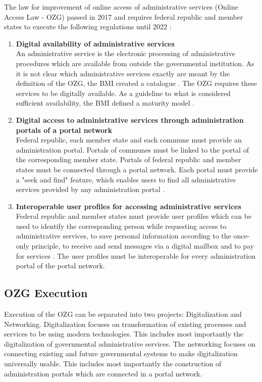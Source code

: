 \documentclass[
     12pt,         %
     a4paper,      %
     BCOR=10mm,version=first,     %
     DIV=14,version=first,        %
     ]{scrreprt}
\begin{document}
The law for improvement of online access of administrative services (Online Access Law - OZG) passed in 2017 and requires federal republic and member states to execute the following regulations until 2022 \cite{BMI:OZG_Wortlaut}:
\begin{enumerate}
    \item \textbf{Digital availability of administrative services} \\
    An administrative service is the electronic processing of administrative procedures which are available from outside the governmental institution.  As it is not clear which administrative services exactly are meant by the definition of the OZG, the BMI created a catalogue \cite{BMI:Verwaltungsleistungen}. The OZG requires these services to be digitally available. As a guideline to what is considered sufficient availability, the BMI defined a maturity model \cite{BMI:Digitale_Services}.
    \item \textbf{Digital access to administrative services through administration portals of a portal network} \\
    Federal republic, each member state and each commune must provide an administration portal. Portals of communes must be linked to the portal of the corresponding member state. Portals of federal republic and member states must be connected through a portal network. \cite{BMI:Portalverbund} Each portal must provide a "seek and find" feature, which enables users to find all administrative services provided by any administration portal \cite{Cotar:Drucksache_19/19089}. 
    \item \textbf{Interoperable user profiles for accessing administrative services} \\
    Federal republic and member states must provide user profiles which can be used to identify the corresponding person while requesting access to administrative services, to save personal information according to the once-only principle, to receive and send messages via a digital mailbox and to pay for services \cite{Cotar:Drucksache_19/19089}. The user profiles must be interoperable for every administration portal of the portal network.
\end{enumerate}

\subsection{OZG Execution}

Execution of the OZG can be separated into two projects: Digitalization and Networking. Digitalization focuses on transformation of existing processes and services to be using modern technologies. This includes most importantly the digitalization of governmental administrative services. The networking focuses on connecting existing and future governmental systems to make digitalization universally usable. This includes most importantly the construction of administration portals which are connected in a portal network.
\end{document}
